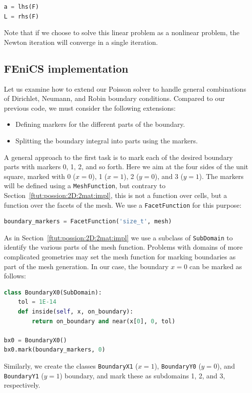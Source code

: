 \documentclass[graybox,envcountchap,sectrefs,final]{svmonodo}
\begin{document}
\begin{lstlisting}[language=Python,style=graycolor]
a = lhs(F)
L = rhs(F)
\end{lstlisting}
Note that if we choose to solve this linear problem as a nonlinear
problem, the Newton iteration will converge in a single iteration.

\subsection{FEniCS implementation}

Let us examine how to extend our Poisson solver to handle general
combinations of Dirichlet, Neumann, and Robin boundary conditions.
Compared to our previous code, we must consider the following
extensions:

\begin{itemize}
  \item Defining markers for the different parts of the boundary.

  \item Splitting the boundary integral into parts using the markers.
\end{itemize}

\noindent
A general approach to the first task is to mark each of the desired
boundary parts with markers 0, 1, 2, and so forth. Here we aim at the
four sides of the unit square, marked with 0 ($x=0$), 1 ($x=1$), 2
($y=0$), and 3 ($y=1$).  The markers will be defined using a
\texttt{MeshFunction}, but contrary to Section~\ref{ftut:possion:2D:2mat:impl}, this is not a function over cells, but
a function over the facets of the mesh. We use a \texttt{FacetFunction} for
this purpose:

\begin{lstlisting}[language=Python,style=graycolor]
boundary_markers = FacetFunction('size_t', mesh)
\end{lstlisting}
As in Section~\ref{ftut:possion:2D:2mat:impl} we use a subclass of
\texttt{SubDomain} to identify the various parts of the mesh
function. Problems with domains of more complicated geometries may set
the mesh function for marking boundaries as part of the mesh
generation.  In our case, the boundary $x = 0$ can be marked
as follows:

\begin{lstlisting}[language=Python,style=graycolor]
class BoundaryX0(SubDomain):
    tol = 1E-14
    def inside(self, x, on_boundary):
        return on_boundary and near(x[0], 0, tol)

bx0 = BoundaryX0()
bx0.mark(boundary_markers, 0)
\end{lstlisting}
Similarly, we create the classes \texttt{BoundaryX1} ($x=1$), \texttt{BoundaryY0}
($y=0$), and \texttt{BoundaryY1} ($y=1$) boundary, and mark these as
subdomains 1, 2, and 3, respectively.
\end{document}

